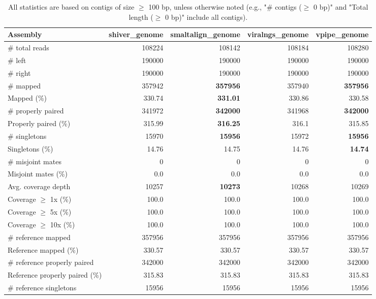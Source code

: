 \documentclass[12pt,a4paper]{article}
\begin{document}
\begin{table}[ht]
\begin{center}
\caption{All statistics are based on contigs of size $\geq$ 100 bp, unless otherwise noted (e.g., "\# contigs ($\geq$ 0 bp)" and "Total length ($\geq$ 0 bp)" include all contigs).}
\begin{tabular}{|l*{4}{|r}|}
\hline
Assembly & shiver\_genome & smaltalign\_genome & viralngs\_genome & vpipe\_genome \\ \hline
\# total reads & 108224 & 108142 & 108184 & 108280 \\ \hline
\# left & 190000 & 190000 & 190000 & 190000 \\ \hline
\# right & 190000 & 190000 & 190000 & 190000 \\ \hline
\# mapped & 357942 & {\bf 357956} & 357940 & {\bf 357956} \\ \hline
Mapped (\%) & 330.74 & {\bf 331.01} & 330.86 & 330.58 \\ \hline
\# properly paired & 341972 & {\bf 342000} & 341968 & {\bf 342000} \\ \hline
Properly paired (\%) & 315.99 & {\bf 316.25} & 316.1 & 315.85 \\ \hline
\# singletons & 15970 & {\bf 15956} & 15972 & {\bf 15956} \\ \hline
Singletons (\%) & 14.76 & 14.75 & 14.76 & {\bf 14.74} \\ \hline
\# misjoint mates & 0 & 0 & 0 & 0 \\ \hline
Misjoint mates (\%) & 0.0 & 0.0 & 0.0 & 0.0 \\ \hline
Avg. coverage depth & 10257 & {\bf 10273} & 10268 & 10269 \\ \hline
Coverage $\geq$ 1x (\%) & 100.0 & 100.0 & 100.0 & 100.0 \\ \hline
Coverage $\geq$ 5x (\%) & 100.0 & 100.0 & 100.0 & 100.0 \\ \hline
Coverage $\geq$ 10x (\%) & 100.0 & 100.0 & 100.0 & 100.0 \\ \hline
\# reference mapped & 357956 & 357956 & 357956 & 357956 \\ \hline
Reference mapped (\%) & 330.57 & 330.57 & 330.57 & 330.57 \\ \hline
\# reference properly paired & 342000 & 342000 & 342000 & 342000 \\ \hline
Reference properly paired (\%) & 315.83 & 315.83 & 315.83 & 315.83 \\ \hline
\# reference singletons & 15956 & 15956 & 15956 & 15956 \\ \hline

\end{tabular}
\end{center}
\end{table}
\end{document}
